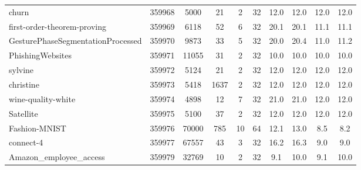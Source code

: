 \documentclass[11pt]{article}
\begin{document}
\begin{table}[H]
{\begin{tabular}{@{}lccccc|cc|cc@{}}
churn                                       & 359968         & 5000        & 21         & 2         & 32          & 12.0                     & 12.0          & 12.0                        & 12.0              \\
first-order-theorem-proving                 & 359969         & 6118        & 52         & 6         & 32          & 20.1                     & 20.1          & 11.1                        & 11.1              \\
GesturePhaseSegmentationProcessed           & 359970         & 9873        & 33         & 5         & 32          & 20.0                     & 20.4          & 11.0                        & 11.2              \\
PhishingWebsites                            & 359971         & 11055       & 31         & 2         & 32          & 10.0                     & 10.0          & 10.0                        & 10.0              \\
sylvine                                     & 359972         & 5124        & 21         & 2         & 32          & 12.0                     & 12.0          & 12.0                        & 12.0              \\
christine                                   & 359973         & 5418        & 1637       & 2         & 32          & 12.0                     & 12.0          & 12.0                        & 12.0              \\
wine-quality-white                          & 359974         & 4898        & 12         & 7         & 32          & 21.0                     & 21.0          & 12.0                        & 12.0              \\
Satellite                                   & 359975         & 5100        & 37         & 2         & 32          & 12.0                     & 12.0          & 12.0                        & 12.0              \\
Fashion-MNIST                               & 359976         & 70000       & 785        & 10        & 64          & 12.1                     & 13.0          & 8.5                         & 8.2               \\
connect-4                                   & 359977         & 67557       & 43         & 3         & 32          & 16.2                     & 16.3          & 9.0                         & 9.0               \\
Amazon\_employee\_access                    & 359979         & 32769       & 10         & 2         & 32          & 9.1                      & 10.0          & 9.1                         & 10.0              \\

\end{tabular}}
\end{table}
\end{document}
